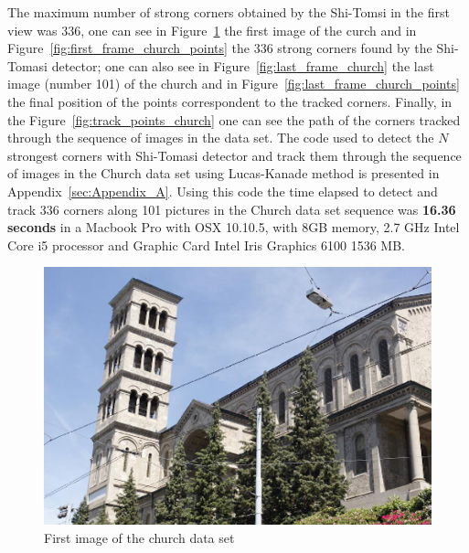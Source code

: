 The maximum number of strong corners obtained by the Shi-Tomsi in the first view was 336, one can see in Figure~\ref{fig:first_frame_church} the first image of the curch and in Figure~\ref{fig:first_frame_church_points} the 336 strong corners found by the Shi-Tomasi detector; one can also see in Figure~\ref{fig:last_frame_church} the last image (number 101) of the church and in Figure~\ref{fig:last_frame_church_points} the final position of the points correspondent to the tracked corners. Finally, in the Figure~\ref{fig:track_points_church} one can see the path of the corners tracked through the sequence of images in the data set. The code used to detect the $N$ strongest corners with Shi-Tomasi detector and track them through the sequence of images in the Church data set using Lucas-Kanade method is presented in Appendix~\ref{sec:Appendix_A}. Using this code the time elapsed to detect and track 336 corners along 101 pictures in the Church data set sequence was \textbf{16.36 seconds} in a Macbook Pro with OSX 10.10.5, with 8GB memory, 2.7 GHz Intel Core i5 processor and Graphic Card Intel Iris Graphics 6100 1536 MB. 

\begin{figure}[h!]
\centering
\includegraphics[width=1 \textwidth]{./Diagrams/first_frame_church.png}
\caption{First image of the church data set}
\label{fig:first_frame_church}
\end{figure}

